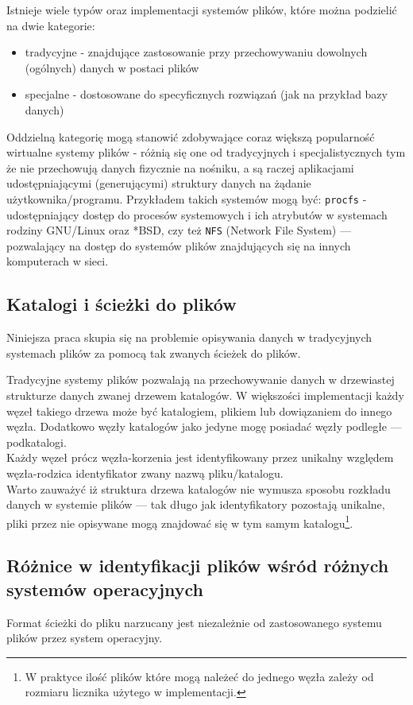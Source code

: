 \par
Istnieje wiele typów oraz implementacji systemów plików, które można podzielić na dwie kategorie:

\begin{itemize}
\item tradycyjne - znajdujące zastosowanie przy przechowywaniu dowolnych (ogólnych) danych w postaci plików
\item specjalne - dostosowane do specyficznych rozwiązań (jak na przykład bazy danych)
\end{itemize}

Oddzielną kategorię mogą stanowić zdobywające coraz większą popularność wirtualne systemy plików - różnią się one od tradycyjnych i specjalistycznych tym że nie przechowują danych fizycznie na nośniku, a są raczej aplikacjami udostępniającymi (generującymi) struktury danych na żądanie użytkownika/programu. Przykładem takich systemów mogą być: \texttt{procfs} - udostępniający dostęp do procesów systemowych i ich atrybutów w systemach rodziny GNU/Linux oraz *BSD, czy też \texttt{NFS} (Network File System) --- pozwalający na dostęp do systemów plików znajdujących się na innych komputerach w sieci.

\subsection{Katalogi i ścieżki do plików}
Niniejsza praca skupia się na problemie opisywania danych w tradycyjnych systemach plików za pomocą tak zwanych ścieżek do plików.

\par
Tradycyjne systemy plików pozwalają na przechowywanie danych w drzewiastej strukturze danych zwanej drzewem katalogów. W większości implementacji każdy węzeł takiego drzewa może być katalogiem, plikiem lub dowiązaniem do innego węzła. Dodatkowo węzły katalogów jako jedyne mogę posiadać węzły podległe --- podkatalogi.\\
Każdy węzeł prócz węzła-korzenia jest identyfikowany przez unikalny względem węzła-rodzica identyfikator zwany nazwą pliku/katalogu.\\
Warto zauważyć iż struktura drzewa katalogów nie wymusza sposobu rozkładu danych w systemie plików --- tak długo jak identyfikatory pozostają unikalne, pliki przez nie opisywane mogą znajdować się w tym samym katalogu\footnote{W praktyce ilość plików które mogą należeć do jednego węzła zależy od rozmiaru licznika użytego w implementacji.}.

\subsection{Różnice w identyfikacji plików wśród różnych systemów operacyjnych}
Format ścieżki do pliku narzucany jest niezależnie od zastosowanego systemu plików przez system operacyjny.

